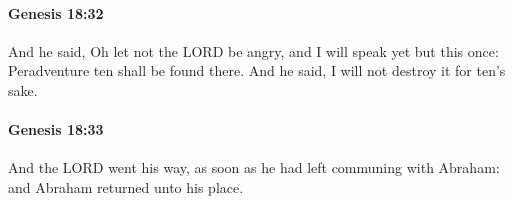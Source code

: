		\paragraph{Genesis 18:32} %
			\label{GENESIS-18-32}

			And he said, Oh let not the LORD be angry, and I will speak yet but this once: Peradventure ten shall be found there. And he said, I will not destroy it for ten's sake.


		\paragraph{Genesis 18:33} %
			\label{GENESIS-18-33}

			And the LORD went his way, as soon as he had left communing with Abraham: and Abraham returned unto his place.

